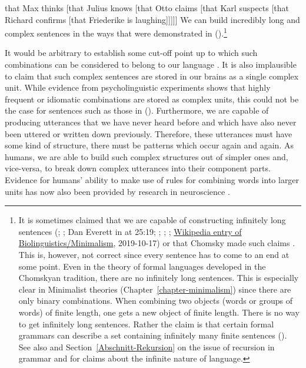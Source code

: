 \ea
\label{ex-that-max-thinks-that-recursion}
that Max thinks [that Julius knows [that Otto claims [that Karl suspects [that Richard confirms [that Friederike is laughing]]]]]
\z
\largerpage[2]
\noindent
We can build incredibly long and complex sentences in the ways that were demonstrated in ().\footnote{%
 It is sometimes claimed that we are capable of constructing infinitely long sentences (\citealp*[]{NKN2001a}; \citealp[]{KS2008a-u}; Dan Everett in  at 25:19;
 \citealp*[]{Chesi2015a-u}; \citealp[]{Lin2017a}; \citealp[]{Martorell2018a};
 \href{https://en.wikipedia.org/wiki/Biolinguistics\#Minimalist_Program}{Wikipedia entry of
   Biolinguistics/Minimalism}, 2019-10-17)
 or that Chomsky made such claims \citep[]{Leiss2003a}. This
 is, however, not correct since every sentence has to come to an end at some point. Even in the theory of formal languages developed in the Chomskyan
tradition, there are no infinitely long sentences. This is especially clear in Minimalist theories
(Chapter~\ref{chapter-minimalism}) since there are only binary combinations. When combining two
objects (words or groups of words) of finite length, one gets a new object of finite length. There is no way to get
infinitely long sentences. Rather the claim is that certain formal grammars can describe a
set containing infinitely many finite sentences (\citealp[]{Chomsky57a}). See also  and
 Section~\ref{Abschnitt-Rekursion} on the issue of recursion in grammar and for claims about the
 infinite nature of language.}


It would be arbitrary to establish some cut-off point up to which such combinations can
be considered to belong to our language \parencites[]{Harris57a}[]{Chomsky57a}. 
It is also implausible to claim that such complex sentences are stored in our brains as a single complex
unit. While evidence from psycholinguistic experiments shows that highly frequent or
idiomatic combinations are stored as complex units, this could not be the case for sentences such as
those in (). Furthermore, we are capable of producing utterances that we have never heard
before and which have also never been uttered or written down previously. Therefore, these utterances
must have some kind of structure, there must be patterns which occur again and again. As humans, we
are able to build such complex structures out of simpler ones and, vice-versa, to break down 
complex utterances into their component parts. Evidence for humans' ability to make use of rules for combining
words into larger units has now also been provided by research in neuroscience \citep[]{Pulvermueller2010a}.

